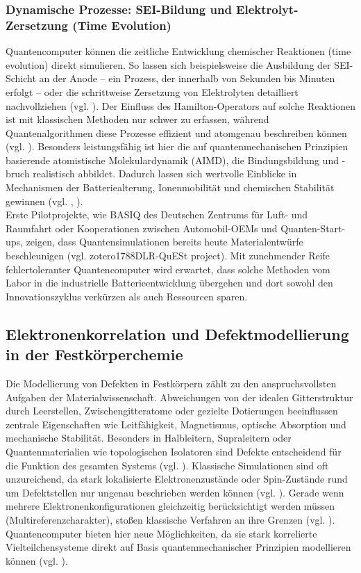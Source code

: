 \subsubsection{Dynamische Prozesse: SEI-Bildung und Elektrolyt-Zersetzung (Time Evolution)}
Quantencomputer können die zeitliche Entwicklung chemischer Reaktionen (time evolution) direkt simulieren. So lassen sich beispielsweise die Ausbildung der SEI-Schicht an der Anode – ein Prozess, der innerhalb von Sekunden bis Minuten erfolgt – oder die schrittweise Zersetzung von Elektrolyten detailliert nachvollziehen (vgl. \cite{hanaor_computational_2024}). Der Einfluss des Hamilton-Operators auf solche Reaktionen ist mit klassischen Methoden nur schwer zu erfassen, während Quantenalgorithmen diese Prozesse effizient und atomgenau beschreiben können (vgl. \cite{weidman_quantum_2024}). Besonders leistungsfähig ist hier die auf quantenmechanischen Prinzipien basierende atomistische Molekulardynamik (AIMD), die Bindungsbildung und -bruch realistisch abbildet. Dadurch lassen sich wertvolle Einblicke in Mechanismen der Batteriealterung, Ionenmobilität und chemischen Stabilität gewinnen (vgl. \cite{hanaor_computational_2024}, \cite{weidman_quantum_2024}).
\newline\\
Erste Pilotprojekte, wie BASIQ des Deutschen Zentrums für Luft- und Raumfahrt oder Kooperationen zwischen Automobil-OEMs und Quanten-Start-ups, zeigen, dass Quantensimulationen bereits heute Materialentwürfe beschleunigen (vgl. \cite{}zotero1788DLR-QuESt project). Mit zunehmender Reife fehlertoleranter Quantencomputer wird erwartet, dass solche Methoden vom Labor in die industrielle Batterieentwicklung übergehen und dort sowohl den Innovationszyklus verkürzen als auch Ressourcen sparen.

\subsection{Elektronenkorrelation und Defektmodellierung in der Festkörperchemie}
\label{Chemie_Elektronenkorrelation}
Die Modellierung von Defekten in Festkörpern zählt zu den anspruchsvollsten Aufgaben der Materialwissenschaft. Abweichungen von der idealen Gitterstruktur durch Leerstellen, Zwischengitteratome oder gezielte Dotierungen beeinflussen zentrale Eigenschaften wie Leitfähigkeit, Magnetismus, optische Absorption und mechanische Stabilität. Besonders in Halbleitern, Supraleitern oder Quantenmaterialien wie topologischen Isolatoren sind Defekte entscheidend für die Funktion des gesamten Systems (vgl. \cite{bassett_quantum_2019}).
Klassische Simulationen sind oft unzureichend, da stark lokalisierte Elektronenzustände oder Spin-Zustände rund um Defektstellen nur ungenau beschrieben werden können (vgl. \cite{bauer_quantum_2020}). Gerade wenn mehrere Elektronenkonfigurationen gleichzeitig berücksichtigt werden müssen (Multireferenzcharakter), stoßen klassische Verfahren an ihre Grenzen (vgl. \cite{bassett_quantum_2019}).
Quantencomputer bieten hier neue Möglichkeiten, da sie stark korrelierte Vielteilchensysteme direkt auf Basis quantenmechanischer Prinzipien modellieren können (vgl. \cite{daley_practical_2022}).

